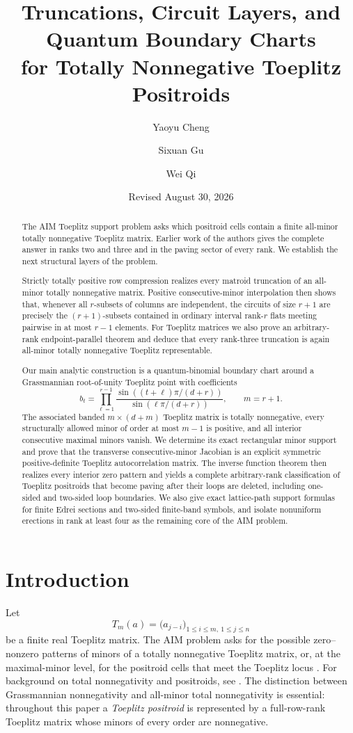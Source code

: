 \documentclass[11pt]{amsart}
\title[Toeplitz positroid truncations and charts]
{Truncations, Circuit Layers, and Quantum Boundary Charts\\
for Totally Nonnegative Toeplitz Positroids}
\author{Yaoyu Cheng}
\author{Sixuan Gu}
\author{Wei Qi}
\date{Revised August 30, 2026}
\theoremstyle{definition}
\theoremstyle{remark}
\begin{document}
\begin{abstract}
The AIM Toeplitz support problem asks which positroid cells contain a finite all-minor totally nonnegative Toeplitz matrix.  Earlier work of the authors gives the complete answer in ranks two and three and in the paving sector of every rank.  We establish the next structural layers of the problem.

Strictly totally positive row compression realizes every matroid truncation of an all-minor totally nonnegative matrix.  Positive consecutive-minor interpolation then shows that, whenever all $r$-subsets of columns are independent, the circuits of size $r+1$ are precisely the $(r+1)$-subsets contained in ordinary interval rank-$r$ flats meeting pairwise in at most $r-1$ elements.  For Toeplitz matrices we also prove an arbitrary-rank endpoint-parallel theorem and deduce that every rank-three truncation is again all-minor totally nonnegative Toeplitz representable.

Our main analytic construction is a quantum-binomial boundary chart around a Grassmannian root-of-unity Toeplitz point with coefficients
\[
 b_t=\prod_{\ell=1}^{r-1}\frac{\sin((t+\ell)\pi/(d+r))}{\sin(\ell\pi/(d+r))},
 \qquad m=r+1.
\]
The associated banded $m\times(d+m)$ Toeplitz matrix is totally nonnegative, every structurally allowed minor of order at most $m-1$ is positive, and all interior consecutive maximal minors vanish.  We determine its exact rectangular minor support and prove that the transverse consecutive-minor Jacobian is an explicit symmetric positive-definite Toeplitz autocorrelation matrix.  The inverse function theorem then realizes every interior zero pattern and yields a complete arbitrary-rank classification of Toeplitz positroids that become paving after their loops are deleted, including one-sided and two-sided loop boundaries.  We also give exact lattice-path support formulas for finite Edrei sections and two-sided finite-band symbols, and isolate nonuniform erections in rank at least four as the remaining core of the AIM problem.
\end{abstract}

\maketitle
\section{Introduction}

Let
\[
 T_m(a)=\bigl(a_{j-i}\bigr)_{1\le i\le m,\ 1\le j\le n}
\]
be a finite real Toeplitz matrix.  The AIM problem asks for the possible zero--nonzero patterns of minors of a totally nonnegative Toeplitz matrix, or, at the maximal-minor level, for the positroid cells that meet the Toeplitz locus \cite{AIM}.  For background on total nonnegativity and positroids, see \cite{FallatJohnson,Postnikov}.  The distinction between Grassmannian nonnegativity and all-minor total nonnegativity is essential: throughout this paper a \emph{Toeplitz positroid} is represented by a full-row-rank Toeplitz matrix whose minors of every order are nonnegative.
\end{document}
